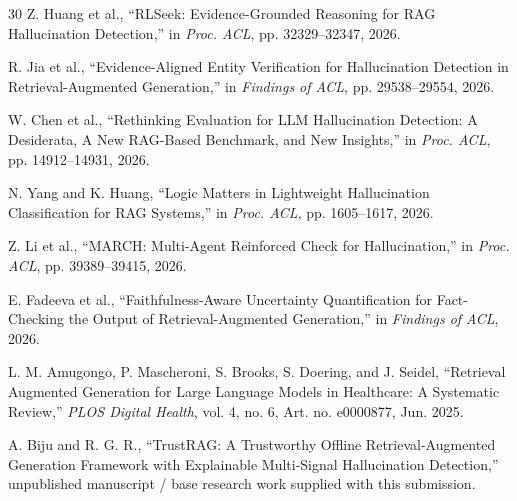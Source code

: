 \documentclass[conference]{IEEEtran}
\begin{document}
\begin{thebibliography}{30}
Z. Huang et al., ``RLSeek: Evidence-Grounded Reasoning for RAG Hallucination Detection,'' in \emph{Proc. ACL}, pp. 32329--32347, 2026.

R. Jia et al., ``Evidence-Aligned Entity Verification for Hallucination Detection in Retrieval-Augmented Generation,'' in \emph{Findings of ACL}, pp. 29538--29554, 2026.

W. Chen et al., ``Rethinking Evaluation for LLM Hallucination Detection: A Desiderata, A New RAG-Based Benchmark, and New Insights,'' in \emph{Proc. ACL}, pp. 14912--14931, 2026.

N. Yang and K. Huang, ``Logic Matters in Lightweight Hallucination Classification for RAG Systems,'' in \emph{Proc. ACL}, pp. 1605--1617, 2026.

Z. Li et al., ``MARCH: Multi-Agent Reinforced Check for Hallucination,'' in \emph{Proc. ACL}, pp. 39389--39415, 2026.

E. Fadeeva et al., ``Faithfulness-Aware Uncertainty Quantification for Fact-Checking the Output of Retrieval-Augmented Generation,'' in \emph{Findings of ACL}, 2026.

L. M. Amugongo, P. Mascheroni, S. Brooks, S. Doering, and J. Seidel, ``Retrieval Augmented Generation for Large Language Models in Healthcare: A Systematic Review,'' \emph{PLOS Digital Health}, vol. 4, no. 6, Art. no. e0000877, Jun. 2025.

A. Biju and R. G. R., ``TrustRAG: A Trustworthy Offline Retrieval-Augmented Generation Framework with Explainable Multi-Signal Hallucination Detection,'' unpublished manuscript / base research work supplied with this submission.

\end{thebibliography}
\end{document}
